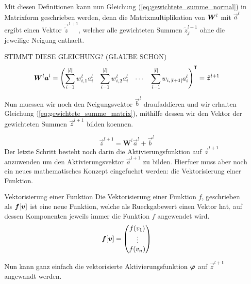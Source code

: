\documentclass[../main]{subfiles}
\begin{document}
\para{}
Mit diesen Definitionen kann nun Gleichung (\ref{eq:gewichtete_summe_normal}) in
Matrixform geschrieben werden, denn die Matrixmultiplikation von $\bm{W}^l$ mit
$\vec{a}^{l}$ ergibt einen Vektor $\vec{\tilde{z}}^{l+1}$, welcher alle gewichteten
Summen $\tilde{z}_j^{l+1}$ ohne die jeweilige Neigung enthaelt.

STIMMT DIESE GLEICHUNG? (GLAUBE SCHON)
\begin{equation*}
  \bm{W}^l \bm{a}^{l} = \begin{pmatrix}\displaystyle \sum_{i=1}^{|l|} w_{i,1}^l a_i^l &\displaystyle \sum_{i=1}^{|l|} w_{i,2}^l a_i^l & \cdots &\displaystyle \sum_{i=1}^{|l|} w_{i,|l+1|} a_i^l \end{pmatrix}^{\mathsf{T}} = \bm{\tilde{z}}^{l+1}
\end{equation*}
\para{}

Nun muessen wir noch den Neigungsvektor $\vec{b}^l$ draufaddieren und wir
erhalten Gleichung (\ref{eq:gewichtete_summe_matrix}), mithilfe dessen wir den
Vektor der gewichteten Summen $\vec{z}^{l+1}$ bilden koennen.

\begin{equation}\label{eq:gewichtete_summe_matrix}
  \vec{z}^{l+1} = \mathbf{W}^{l} \vec{a}^{l} + \vec{b}^{l}
\end{equation}
\para{}
Der letzte Schritt besteht noch darin die Aktivierungsfunktion auf $\vec{z}^{l+1}$
anzuwenden um den Aktivierungsvektor $\vec{a}^{l+1}$ zu bilden.
Hierfuer muss aber noch ein neues mathematisches
Konzept eingefuehrt werden: die Vektorisierung einer Funktion.
\para{}

\begin{defbox}{Vektorisierung einer Funktion}
  Die Vektorisierung einer Funktion $f$, geschrieben als $\bm{f}[\bm{v}]$ ist eine
  neue Funktion, welche als Rueckgabewert einen Vektor hat, auf dessen
  Komponenten jeweils immer die Funktion $f$ angewendet wird.
  \begin{equation*}
    \bm{f}[\bm{v}]=
    \begin{pmatrix}
      f(v_1)\\
      \vdots \\
      f(v_n)\\
    \end{pmatrix}
  \end{equation*}
\end{defbox}
\para{}

Nun kann ganz einfach die vektorisierte Aktivierungsfunktion $\bm{\varphi}$ auf
$\vec{z}^{l+1}$ angewandt werden.
\end{document}
